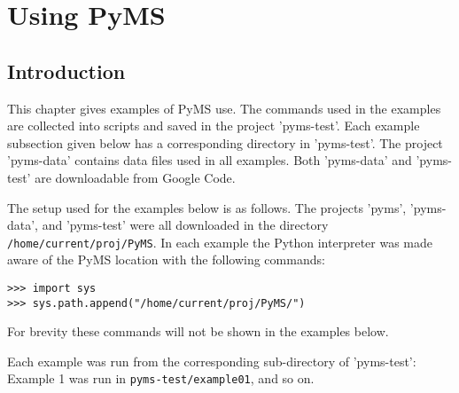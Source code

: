 

\chapter{Using PyMS}

\section{Introduction}

This chapter gives examples of PyMS use. The commands used in the examples
are collected into scripts and saved in the project 'pyms-test'.  Each example
subsection given below has a corresponding directory in 'pyms-test'. The
project 'pyms-data' contains data files used in all examples. Both 'pyms-data'
and 'pyms-test' are downloadable from Google Code.

The setup used for the examples below is as follows. The projects 'pyms',
'pyms-data', and 'pyms-test' were all downloaded in the directory
{\tt /home/current/proj/PyMS}. In each example the Python interpreter
was made aware of the PyMS location with the following commands:

\begin{verbatim}
>>> import sys
>>> sys.path.append("/home/current/proj/PyMS/")
\end{verbatim}

For brevity these commands will not be shown in the examples below.

Each example was run from the corresponding sub-directory of 'pyms-test':
Example 1 was run in {\tt pyms-test/example01}, and so on.

